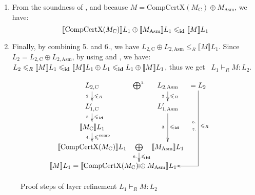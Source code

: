\begin{enumerate}
\item From the soundness of 
, 
and because $M = \textrm{CompCertX}(M_\text{C}) \oplus M_\text{Asm}$,
we have:
\[\llbracket \textrm{CompCertX}(M_\text{C}) \rrbracket L_1 \oplus
\llbracket M_\text{Asm} \rrbracket L_1 \leqslant_{\textbf{id}} \llbracket
M \rrbracket
L_1 \]
\item
Finally, by combining 5. and 6., we have 
$L_{2, \text{C}} \oplus L_{2, \text{Asm}}
\leqslant_R  \llbracket M \rrbracket L_1$.  
Since~ $L_2 = L_{2, \text{C}} \oplus L_{2, \text{Asm}}$, 
by using 
and ,
we have: 
$L_2 \leqslant_R  \llbracket M \rrbracket L_1
\leqslant_{\textbf{id}} \llbracket M \rrbracket L_1 \oplus L_1
\leqslant_{\textbf{id}} L_1 \oplus \llbracket M \rrbracket L_1$,
thus we get ~$L_1 \vdash_R M : L_2$.
\end{enumerate} 

\begin{figure}[!ht]
\[
\xymatrix@R=12pt@C=3pt{
%
L_{2, \text{C}} \ar[d]^{\leqslant_R}_{\text{\tiny 2.}} &
\bigoplus^{\text{\tiny 1.}} &
L_{2, \text{Asm}} \ar[d]^{\leqslant_R}_{\text{\tiny 2.}} &
= L_2 \\
%
L'_{1, \text{C}} \ar[d]^{\leqslant_\id}_{\text{\tiny 3.}} & &
L'_{1, \text{Asm}} \ar[dd]^{\leqslant_\id}_{\text{\tiny 3.}} \\
%
\llbracket M_\text{C} \rrbracket L_1
\ar[d]^{\leqslant^{\textrm{comp}}}_{\text{\tiny 4.}} \\
%
\llbracket \textrm{CompCertX}(M_\text{C}) \rrbracket L_1 &
\bigoplus \ar[d]^{\leqslant_\id}_{\text{\tiny 6.}} &
\llbracket M_\text{Asm} \rrbracket L_1 \\
%
& + \save[]+<-37.90pt,0pt>*\txt{
$\llbracket M \rrbracket L_1 =
 \llbracket \textrm{CompCertX}(M_\text{C}) \oplus M_\text{Asm} \rrbracket L_1$
}
\ar@{<-} `_r[rr] [uuuurr]_{\leqslant_R}^{\txt{\tiny 5.\\ \tiny 7.}}
\restore
& &
}
\]
\caption{Proof steps of layer refinement $L_1 \vdash_R M : L_2$}
\label{fig:layer-refinement-proof}
\end{figure}

